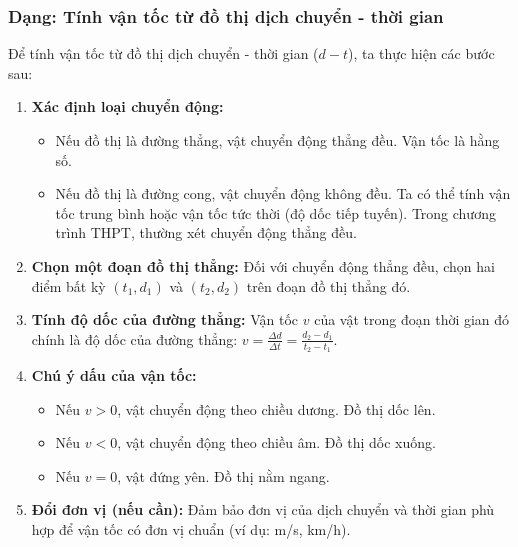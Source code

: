 \subsubsection{Dạng: Tính vận tốc từ đồ thị dịch chuyển - thời gian}
\begin{phuongphap}
Để tính vận tốc từ đồ thị dịch chuyển - thời gian ($d-t$), ta thực hiện các bước sau:
\begin{enumerate}
    \item \textbf{Xác định loại chuyển động:}
    \begin{itemize}
        \item Nếu đồ thị là đường thẳng, vật chuyển động thẳng đều. Vận tốc là hằng số.
        \item Nếu đồ thị là đường cong, vật chuyển động không đều. Ta có thể tính vận tốc trung bình hoặc vận tốc tức thời (độ dốc tiếp tuyến). Trong chương trình THPT, thường xét chuyển động thẳng đều.
    \end{itemize}
    \item \textbf{Chọn một đoạn đồ thị thẳng:} Đối với chuyển động thẳng đều, chọn hai điểm bất kỳ $(t_1, d_1)$ và $(t_2, d_2)$ trên đoạn đồ thị thẳng đó.
    \item \textbf{Tính độ dốc của đường thẳng:} Vận tốc $v$ của vật trong đoạn thời gian đó chính là độ dốc của đường thẳng:
    $v = \frac{\Delta d}{\Delta t} = \frac{d_2 - d_1}{t_2 - t_1}$.
    \item \textbf{Chú ý dấu của vận tốc:}
    \begin{itemize}
        \item Nếu $v > 0$, vật chuyển động theo chiều dương. Đồ thị dốc lên.
        \item Nếu $v < 0$, vật chuyển động theo chiều âm. Đồ thị dốc xuống.
        \item Nếu $v = 0$, vật đứng yên. Đồ thị nằm ngang.
    \end{itemize}
    \item \textbf{Đổi đơn vị (nếu cần):} Đảm bảo đơn vị của dịch chuyển và thời gian phù hợp để vận tốc có đơn vị chuẩn (ví dụ: m/s, km/h).
\end{enumerate}
\end{phuongphap}

